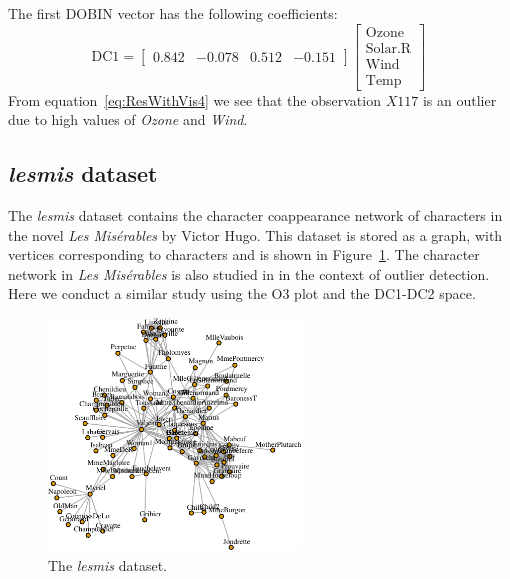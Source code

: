 \documentclass[letter,12pt]{article}
\begin{document}
The first DOBIN vector has the following coefficients:
\begin{equation}\label{eq:ResWithVis4}
	\text{DC1} = \begin{bmatrix}
		0.842 & -0.078 & 0.512 & -0.151
	\end{bmatrix}
	\begin{bmatrix}
		\text{Ozone}   \\
		\text{Solar.R} \\
		\text{Wind}    \\
		\text{Temp}
	\end{bmatrix} \,
\end{equation}
From equation~\eqref{eq:ResWithVis4} we see that the observation $X117$ is an outlier due to high values of \textit{Ozone} and \textit{Wind}.

\subsection{\textit{lesmis} dataset}\label{sec:ResWithVis5}

The \textit{lesmis} dataset \citep{sombrero} contains the character coappearance network of characters in the novel \textit{Les Mis\'erables} by Victor Hugo. This dataset is stored as a graph, with vertices corresponding to characters and is shown in Figure~\ref{fig:lesmisgraph}. The character network in \textit{Les Mis\'erables} is also studied in \cite{wilkinson2017visualizing} in the context of outlier detection. Here we conduct a similar study using the O3 plot and the DC1-DC2 space.

\begin{figure}[!ht]
	\centering
	\includegraphics[width=0.6\textwidth]{lesmis.pdf}
	\caption{The \textit{lesmis} dataset.}
	\label{fig:lesmisgraph}
\end{figure}
\end{document}
